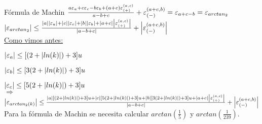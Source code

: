 \begin{subsection}{Fórmula de Machin}
	$\frac{a\varepsilon _{a} + c\varepsilon _{c} - b\varepsilon _{b} + (a+c)\varepsilon _{({+})}^{({a,c})}}{a-b+c} + \varepsilon _{({-})}^{({a+c,b})} = \varepsilon _{a+c-b} = \varepsilon _{arctan_2}$\\
	
	$\left|\varepsilon _{arctan_2}\right| \leq \frac{|a||\varepsilon _{a}| + |c||\varepsilon _{c}| + |b||\varepsilon _{b}| + |a+c|\left|\varepsilon _{({+})}^{({a,c})}\right|}{|a-b+c|} + \left|\varepsilon _{({-})}^{({a+c,b})}\right|$\\
	
	\underline{Como vimos antes:}
	
	$\left|\varepsilon _{a}\right| \leq [(2 + \left|ln(k)\right|) + 3]u$
	
	$\left|\varepsilon _{b}\right| \leq [3(2 + \left|ln(k)\right|) + 3]u$
	
	$\left|\varepsilon _{c}\right| \leq [5(2 + \left|ln(k)\right|) + 3]u$\\
	
	$\Rightarrow$\\
	$\left|\varepsilon _{arctan_2(k)}\right| \leq \frac{|a|[(2 + \left|ln(k)\right|) + 3]u + |c|[5(2 + \left|ln(k)\right|) + 3]u + |b|[3(2 + \left|ln(k)\right|) + 3]u + |a+c|\left|\varepsilon _{({+})}^{({a,c})}\right|}{|a-b+c|} + \left|\varepsilon _{({-})}^{({a+c,b})}\right|$\\
	
	Para la fórmula de Machin se necesita calcular $arctan(\frac{1}{5})$ y $arctan(\frac{1}{239})$.\\
		
	

\end{subsection}
